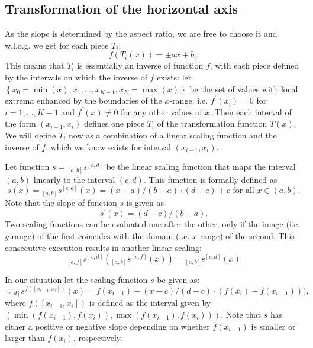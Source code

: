 \documentclass[12pt]{article}\usepackage[]{graphicx}\usepackage[]{color}
\newcommand{\s}[2]{{_{#1}s^{ #2}}}
\begin{document}


\clearpage
%
%
\begin{appendix}
\section{Transformation of the horizontal axis}\label{app.xtrans}
As the slope is determined by the aspect ratio, we are free to choose it and w.l.o.g. we get for each piece $T_i$: 
\[
f(T_i(x)) = \pm a x + b_i.
\]
This means that $T_i$ is essentially an inverse of function $f$, with each piece defined by the   intervals on which the inverse of $f$ exists: let $\left\{x_0 = \min(x), x_1, ..., x_{K-1}, x_K = \max(x) \right\}$ be the set of values with local extrema enhanced by the boundaries of the $x$-range, i.e.  $f^\prime(x_i) = 0$ for  $i = 1, ... , K-1$ and $f^\prime(x) \neq 0$ for any other values of $x$. 
Then each interval of the form $(x_{i-1}, x_i)$ defines one piece $T_i$ of the transformation function $T(x)$. We will define $T_i$ now as a combination of a linear scaling function and the inverse of $f$, which we know exists for interval $(x_{i-1}, x_i)$.

Let function $s = \s{[a,b]}{[c,d]}$ be the linear scaling function that maps  the interval $(a,b)$ linearly to the interval $(c,d)$. This function is formally defined as
\[
s(x) = \s{[a,b]}{[c,d]} (x) = (x-a)/(b-a) \cdot (d-c) + c \text{ for all } x \in (a,b).
\]
Note that the slope of function $s$ is given as
\[
s^\prime(x) = (d-c)/(b-a).
\]
%
Two scaling functions can be evaluated one after the other, only if the image (i.e. $y$-range) of the first coincides with the domain (i.e. $x$-range) of the second. This consecutive execution results in another linear scaling: 
\[
\s{[e,f]}{[c,d]}  \left(  \s{[a,b]}{[e,f]}(x) \right) = \s{[a,b]}{[c,d]} (x)
\]


In our situation let the scaling function $s$ be given as:
\[
\s{[c,d]}{f([x_{i-1}, x_i])}(x) = f(x_{i-1}) + (x-c)/(d-c) \cdot (f(x_{i}) - f(x_{i-1}))),
\]
where $f([x_{i-1}, x_i])$ is defined as the interval given by $(\min(f(x_{i-1}), f(x_i)), \max(f(x_{i-1}), f(x_i)))$.
Note that $s$ has either a positive or negative slope depending on whether $f(x_{i-1})$ is smaller or larger than $f(x_i)$, respectively.


\end{appendix}
\end{document}
